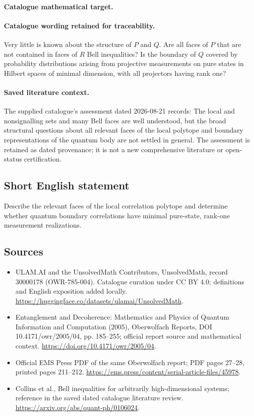 \documentclass[11pt]{article}
\begin{document}
\paragraph{Catalogue mathematical target.}
\paragraph{Catalogue wording retained for traceability.}
Very little is known about the structure of $P$ and $Q$. Are all faces of $P$ that are not contained in faces of $R$ Bell inequalities? Is the boundary of $Q$ covered by probability distributions arising from projective measurements on pure states in Hilbert spaces of minimal dimension, with all projectors having rank one?

\paragraph{Saved literature context.} The supplied catalogue's assessment dated 2026-08-21 records: The local and nonsignalling sets and many Bell faces are well understood, but the broad structural questions about all relevant faces of the local polytope and boundary representations of the quantum body are not settled in general. The assessment is retained as dated provenance; it is not a new comprehensive literature or open-status certification.
\subsection{Short English statement}
Describe the relevant faces of the local correlation polytope and determine whether quantum boundary correlations have minimal pure-state, rank-one measurement realizations.
\subsection{Sources}
\begin{itemize}
\item[\hypertarget{source:30000178:1}{S1}] ULAM.AI and the UnsolvedMath Contributors, UnsolvedMath, record 30000178 (OWR-785-004). Catalogue curation under CC BY 4.0; definitions and English exposition added locally.
\url{https://huggingface.co/datasets/ulamai/UnsolvedMath}.
\item[\hypertarget{source:30000178:2}{S2}] Entanglement and Decoherence: Mathematics and Physics of Quantum Information and Computation (2005), Oberwolfach Reports, DOI 10.4171/owr/2005/04, pp. 185--255; official report source and mathematical context.
\url{https://doi.org/10.4171/owr/2005/04}.
\item[\hypertarget{source:30000178:3}{S3}] Official EMS Press PDF of the same Oberwolfach report; PDF pages 27--28, printed pages 211--212.
\url{https://ems.press/content/serial-article-files/45978}.
\item[\hypertarget{source:30000178:4}{S4}] Collins et al., Bell inequalities for arbitrarily high-dimensional systems; reference in the saved dated catalogue literature review.
\url{https://arxiv.org/abs/quant-ph/0106024}.
\end{itemize}
\label{end:30000178}
\end{document}
